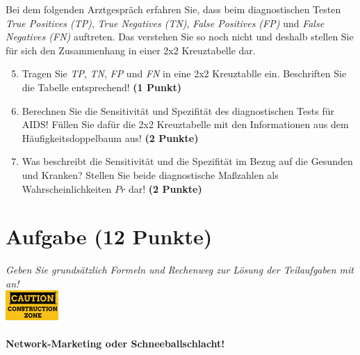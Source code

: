 \documentclass[a4paper, 9pt]{scrartcl}\usepackage[]{graphicx}\usepackage[]{xcolor}
\begin{document}
Bei dem folgenden Arztgespr{\"a}ch erfahren Sie, dass beim diagnostischen
Testen \textit{True Positives (TP)}, \textit{True Negatives (TN)},
\textit{False Positives (FP)} und \textit{False Negatives (FN)}
auftreten. Das verstehen Sie so noch nicht und deshalb stellen Sie f{\"u}r sich
den Zusammenhang in einer 2x2 Kreuztabelle dar.

\begin{enumerate}
  \setcounter{enumi}{4}
\item Tragen Sie \textit{TP}, \textit{TN}, \textit{FP} und \textit{FN} in
  eine 2x2 Kreuztablle ein. Beschriften Sie die Tabelle entsprechend!
  \textbf{(1 Punkt)}
\item Berechnen Sie die Sensitivit{\"a}t und Spezifit{\"a}t des diagnostischen Tests
  f{\"u}r AIDS! F{\"u}llen Sie daf{\"u}r die 2x2 Kreuztabelle mit den Informationen aus
  dem H{\"a}ufigkeitsdoppelbaum aus! \textbf{(2 Punkte)}
\item Was beschreibt die Sensitivit{\"a}t und die Spezifit{\"a}t im Bezug auf die
  Gesunden und Kranken? Stellen Sie beide diagnostische Ma{\ss}zahlen als
  Wahrscheinlichkeiten $Pr$ dar! \textbf{(2 Punkte)} 
\end{enumerate}



 
\clearpage

\section{Aufgabe \hfill (12 Punkte)}

\textit{Geben Sie grunds{\"a}tzlich Formeln und Rechenweg zur L{\"o}sung der
  Teilaufgaben mit an!} \\[1Ex]

\hfill\href{}{\includegraphics[width = 2cm]{img/caution}} %
\hspace{2Ex}

\paragraph{Network-Marketing oder Schneeballschlacht!}
\end{document}
